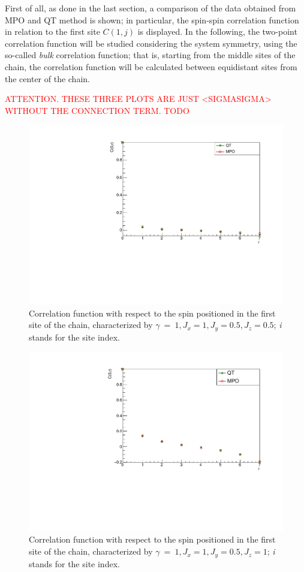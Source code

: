 First of all, as done in the last section, a comparison of the data obtained from MPO and QT method is shown; in particular, the spin-spin correlation function in relation to the first site $C(1, j)$ is displayed. In the following, the two-point correlation function will be studied considering the system symmetry, using the so-called \emph{bulk} correlation function; that is, starting from the middle sites of the chain, the correlation function will be calculated between equidistant sites from the center of the chain. 

\textcolor{red}{ATTENTION. THESE THREE PLOTS ARE JUST <SIGMASIGMA> WITHOUT THE CONNECTION TERM. TODO}
\begin{figure}[H]
    \centering
    \includegraphics[scale=0.7]{Figures/8sites/CorrFunc1_8s_J10505.pdf}
    \caption{Correlation function with respect to the spin positioned in the first site of the chain, characterized by $\gamma~=~1, J_x=1, J_y=0.5, J_z=0.5$; \emph{i} stands for the site index.}
    \label{fig:my_label}
\end{figure}

\begin{figure}[H]
    \centering
    \includegraphics[scale=0.7]{Figures/8sites/CorrFunc1_8s_J1051.pdf}
    \caption{Correlation function with respect to the spin positioned in the first site of the chain, characterized by $\gamma~=~1, J_x=1, J_y=0.5, J_z=1$; \emph{i} stands for the site index.}
    \label{fig:my_label}
\end{figure}

